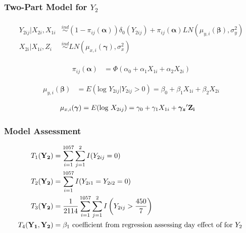 \documentclass[handout]{beamer}\usepackage[]{graphicx}\usepackage[]{color}
\begin{document}
\begin{frame}
\frametitle{Two-Part Model for $Y_2$}

\begin{align*}
\begin{split}
	Y_{2ij}|X_{2i}, X_{1i} &\overset{ind}{\sim} (1-\pi_{ij}(\boldsymbol{\alpha})) \delta_0(Y_{2ij}) + \pi_{ij}(\boldsymbol{\alpha}) LN(\mu_{y,i} (\boldsymbol{\beta}), \sigma_y^2)\\
	X_{2i}|X_{1i}, Z_i &\overset{ind}{\sim} LN(\mu_{x,i} (\boldsymbol{\gamma}), \sigma_x^2)
\end{split}
\end{align*}

\begin{align*}
\pi_{ij}(\boldsymbol{\alpha}) &= \Phi(\alpha_0 + \alpha_1 X_{1i} + \alpha_2 X_{2i}) \end{align*}

\begin{align*}
 \mu_{y,i}(\boldsymbol{\beta}) &=  E(\text{log } Y_{2ij}|Y_{2ij} > 0) = {\beta_0 + \beta_1 X_{1i} + \beta_2 X_{2i}}
 \end{align*} 

\begin{align*}
 \mu_{x,i}(\boldsymbol{\gamma}) &=  E(\text{log } X_{2ij}) = \gamma_0 + \gamma_1 X_{1i} + \boldsymbol{\gamma_z}'{\bf Z_i}  
 \end{align*} 


\end{frame}

\begin{frame}
\frametitle{Model Assessment}

\begin{align*}
	T_1({\bf Y_2}) &= \sum_{i=1}^{1057} \sum_{j=1}^{2} I(Y_{2ij} = 0) \\
	T_2({\bf Y_2}) &= \sum_{i=1}^{1057}  I(Y_{2i1} = Y_{2i2} = 0) \\
	T_3({\bf Y_2}) &= \frac{1}{2114} \sum_{i=1}^{1057} \sum_{j=1}^{2} I \left( Y_{2ij} > \frac{450}{7} \right) \\
	T_4({\bf Y_1,Y_2}) &= \beta_1 \text{ coefficient from regression assessing day effect of for $Y_2$ } 
\end{align*}

\end{frame}
\end{document}
